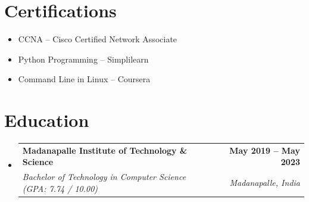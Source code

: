 \documentclass[letterpaper,11pt]{article}
\makeatletter
\newcommand{\resumeSubheading}[4]{
  \vspace{-2pt}\item
    \begin{tabular*}{1.0\textwidth}[t]{l@{\extracolsep{\fill}}r}
      \textbf{\large#1} & \textbf{\small #2} \\
      \textit{\large#3} & \textit{\small #4} \\
     
    \end{tabular*}\vspace{-7pt}
}
\newcommand{\resumeSubHeadingListStart}{\begin{itemize}[leftmargin=0.0in, label={}]}
\newcommand{\resumeSubHeadingListEnd}{\end{itemize}}
\makeatother
\begin{document}
\section{Certifications}
\begin{itemize}[leftmargin=0.2cm, itemsep=1pt]
    \item CCNA -- Cisco Certified Network Associate
    \item Python Programming -- Simplilearn
    \item Command Line in Linux -- Coursera
\end{itemize}
\vspace{6pt}

\section{Education}
\resumeSubHeadingListStart
  \resumeSubheading
    {Madanapalle Institute of Technology \& Science}{May 2019 -- May 2023}
    {Bachelor of Technology in Computer Science (GPA: 7.74 / 10.00)}{Madanapalle, India}
\resumeSubHeadingListEnd
\end{document}
